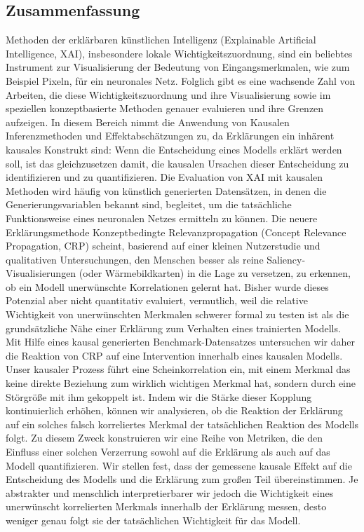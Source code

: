 %
\pagestyle{empty}

\subsection*{Zusammenfassung}
Methoden der erklärbaren künstlichen Intelligenz (Explainable Artificial Intelligence, XAI), insbesondere lokale Wichtigkeitszuordnung, sind ein beliebtes Instrument zur Visualisierung der Bedeutung von Eingangsmerkmalen, wie zum Beispiel Pixeln, für ein neuronales Netz.
Folglich gibt es eine wachsende Zahl von Arbeiten, die diese Wichtigkeitszuordnung und ihre Visualisierung sowie im speziellen konzeptbasierte Methoden genauer evaluieren und ihre Grenzen aufzeigen. In diesem Bereich nimmt die Anwendung von Kausalen Inferenzmethoden und Effektabschätzungen zu, da Erklärungen ein inhärent kausales Konstrukt sind: Wenn die Entscheidung eines Modells erklärt werden soll, ist das gleichzusetzen damit, die kausalen Ursachen dieser Entscheidung zu identifizieren und zu quantifizieren. Die Evaluation von XAI mit kausalen Methoden wird häufig von künstlich generierten Datensätzen, in denen die Generierungsvariablen bekannt sind, begleitet, um die tatsächliche Funktionsweise eines neuronalen Netzes ermitteln zu können. 
Die neuere Erklärungsmethode Konzeptbedingte Relevanzpropagation (Concept Relevance Propagation, CRP) scheint, basierend auf einer kleinen Nutzerstudie und qualitativen Untersuchungen, den Menschen besser als reine Saliency-Visualisierungen (oder Wärmebildkarten) in die Lage zu versetzen, zu erkennen, ob ein Modell unerwünschte Korrelationen gelernt hat. Bisher wurde dieses Potenzial aber nicht quantitativ evaluiert, vermutlich, weil die relative Wichtigkeit von unerwünschten Merkmalen schwerer formal zu testen ist als die grundsätzliche Nähe einer Erklärung zum Verhalten eines trainierten Modells. 
Mit Hilfe eines kausal generierten Benchmark-Datensatzes untersuchen wir daher die Reaktion von CRP auf eine Intervention innerhalb eines kausalen Modells. 
Unser kausaler Prozess führt eine Scheinkorrelation ein, mit einem Merkmal das keine direkte Beziehung zum wirklich wichtigen Merkmal hat, sondern durch eine Störgröße mit ihm gekoppelt ist. Indem wir die Stärke dieser Kopplung kontinuierlich erhöhen, können wir analysieren, ob die Reaktion der Erklärung auf ein solches falsch korreliertes Merkmal der tatsächlichen Reaktion des Modells folgt. Zu diesem Zweck konstruieren wir eine Reihe von Metriken, die den Einfluss einer solchen Verzerrung sowohl auf die Erklärung als auch auf das Modell quantifizieren. Wir stellen fest, dass der gemessene kausale Effekt auf die Entscheidung des Modells und die Erklärung zum großen Teil übereinstimmen. Je abstrakter und menschlich interpretierbarer wir jedoch die Wichtigkeit eines unerwünscht korrelierten Merkmals innerhalb der Erklärung messen, desto weniger genau folgt sie der tatsächlichen Wichtigkeit für das Modell. 
